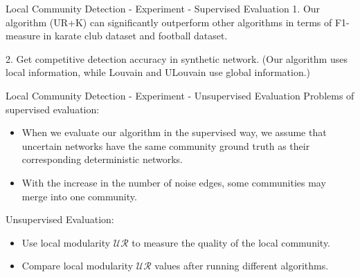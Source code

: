\documentclass[9pt]{beamer}
\begin{document}
\begin{frame}{Local Community Detection - Experiment - Supervised Evaluation}
1. Our algorithm (UR+K) can significantly outperform other algorithms in terms of F1-measure in karate club dataset and football dataset.

2. Get competitive detection accuracy in synthetic network. (Our algorithm uses local information, while Louvain and ULouvain use global information.)






\end{frame}


\begin{frame}{Local Community Detection - Experiment - Unsupervised Evaluation}
Problems of supervised evaluation:
\begin{itemize}
\item When we evaluate our algorithm in the supervised way, we assume that uncertain networks have the same community ground truth as their corresponding deterministic networks.
\item With the increase in the number of noise edges, some communities may merge into one community.
\end{itemize}

Unsupervised Evaluation:
\begin{itemize}
\item Use local modularity $\mathcal{UR}$ to measure the quality of the local community.
\item Compare local modularity $\mathcal{UR}$ values after running different algorithms.
\end{itemize}

\end{frame}
\end{document}
